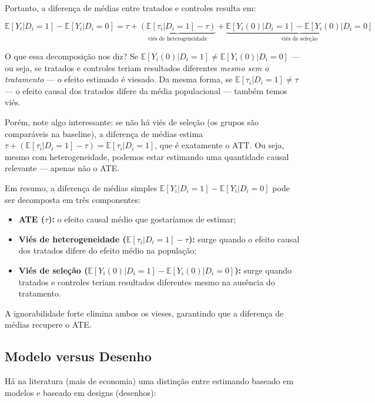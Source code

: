 \documentclass[
]{article}
\providecommand{\tightlist}{%
  \setlength{\itemsep}{0pt}\setlength{\parskip}{0pt}}
\begin{document}
Portanto, a diferença de médias entre tratados e controles resulta em:

\[\mathbb{E}[Y_i|D_i=1] - \mathbb{E}[Y_i|D_i=0] = \tau + \underbrace{(\mathbb{E}[\tau_i|D_i=1] -\tau)}_{\text{viés de heterogeneidade}} + \underbrace{\mathbb{E}[Y_i(0)|D_i=1] - \mathbb{E}[Y_i(0)|D_i=0]}_{\text{viés de seleção}}\]

O que essa decomposição nos diz? Se \(\mathbb{E}[Y_i(0)|D_i=1] \neq \mathbb{E}[Y_i(0)|D_i=0]\) --- ou seja, se tratados e controles teriam resultados diferentes \emph{mesmo sem o tratamento} --- o efeito estimado é viesado. Da mesma forma, se \(\mathbb{E}[\tau_i|D_i=1] \neq \tau\) --- o efeito causal dos tratados difere da média populacional --- também temos viés.

Porém, note algo interessante: se não há viés de seleção (os grupos são comparáveis na baseline), a diferença de médias estima \(\tau + (\mathbb{E}[\tau_i|D_i=1] - \tau) = \mathbb{E}[\tau_i|D_i=1]\), que é exatamente o ATT. Ou seja, mesmo com heterogeneidade, podemos estar estimando uma quantidade causal relevante --- apenas não o ATE.

Em resumo, a diferença de médias simples \(\mathbb{E}[Y_i|D_i=1] - \mathbb{E}[Y_i|D_i=0]\) pode ser decomposta em três componentes:

\begin{itemize}
\tightlist
\item
  \textbf{ATE (\(\tau\)):} o efeito causal médio que gostaríamos de estimar;
\item
  \textbf{Viés de heterogeneidade (\(\mathbb{E}[\tau_i|D_i=1] - \tau\)):} surge quando o efeito causal dos tratados difere do efeito médio na população;
\item
  \textbf{Viés de seleção (\(\mathbb{E}[Y_i(0)|D_i=1] - \mathbb{E}[Y_i(0)|D_i=0]\)):} surge quando tratados e controles teriam resultados diferentes mesmo na ausência do tratamento.
\end{itemize}

A ignorabilidade forte elimina ambos os vieses, garantindo que a diferença de médias recupere o ATE.

\subsection{Modelo versus Desenho}\label{modelo-versus-desenho}

Há na literatura (mais de economia) uma distinção entre estimando baseado em modelos e baseado em designs (desenhos):
\end{document}
